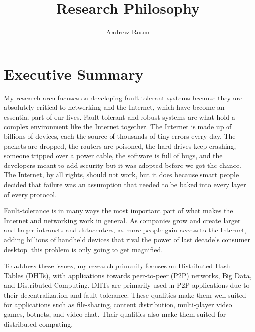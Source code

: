 \documentclass[letterpaper]{article}
\author{Andrew Rosen}
\title{Research Philosophy}
\date{}
\begin{document}
\maketitle



\section{Executive Summary}




My research area focuses on developing fault-tolerant systems because they are absolutely critical to networking and the Internet, which have become an essential part of our lives.
Fault-tolerant and robust systems are what hold a complex environment like the Internet together.
The Internet is made up of billions of devices, each the source of thousands of tiny errors every day.
The packets are dropped, the routers are poisoned, the hard drives keep crashing, someone tripped over a power cable, the software is full of bugs, and the developers meant to add security but it was adopted before we got the chance.
The Internet, by all rights, should not work, but it does because smart people decided that failure was an assumption that needed to be baked into every layer of every protocol.

Fault-tolerance is in many ways the most important part of what makes the Internet and networking work in general.
As companies grow and create larger and larger intranets and datacenters, as more people gain access to the Internet, adding billions of handheld devices that rival the power of last decade's consumer desktop, this problem is only going to get magnified.

To address these issues, my research primarily focuses on Distributed Hash Tables (DHTs), with applications towards peer-to-peer (P2P) networks, Big Data, and Distributed Computing.
DHTs are primarily used in P2P applications due to their decentralization and fault-tolerance. 
These qualities make them well suited for applications such as file-sharing, content distribution, multi-player video games, botnets, and video chat.
Their qualities also make them suited for distributed computing.
\end{document}
